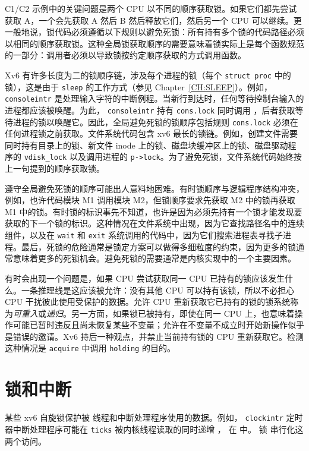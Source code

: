 C1/C2 示例中的关键问题是两个 CPU 以不同的顺序获取锁。如果它们都先尝试获取 A，一个会先获取 A 然后 B 然后释放它们，然后另一个 CPU 可以继续。更一般地说，锁代码必须遵循以下规则以避免死锁：所有持有多个锁的代码路径必须以相同的顺序获取锁。这种全局锁获取顺序的需要意味着锁实际上是每个函数规范的一部分：调用者必须以导致锁按约定顺序获取的方式调用函数。

Xv6 有许多长度为二的锁顺序链，涉及每个进程的锁（每个
\lstinline{struct proc}
中的锁），这是由于
\lstinline{sleep}
的工作方式（参见 Chapter~\ref{CH:SLEEP}）。例如，
\lstinline{consoleintr}
是处理输入字符的中断例程。当新行到达时，任何等待控制台输入的进程都应该被唤醒。为此，
\lstinline{consoleintr}
持有
\lstinline{cons.lock}
同时调用
，后者获取等待进程的锁以唤醒它。因此，全局避免死锁的锁顺序包括规则
\lstinline{cons.lock}
必须在任何进程锁之前获取。文件系统代码包含 xv6 最长的锁链。例如，创建文件需要同时持有目录上的锁、新文件 inode 上的锁、磁盘块缓冲区上的锁、磁盘驱动程序的 \lstinline{vdisk_lock} 以及调用进程的 \lstinline{p->lock}。为了避免死锁，文件系统代码始终按上一句提到的顺序获取锁。

遵守全局避免死锁的顺序可能出人意料地困难。有时锁顺序与逻辑程序结构冲突，例如，也许代码模块 M1 调用模块 M2，但锁顺序要求先获取 M2 中的锁再获取 M1 中的锁。有时锁的标识事先不知道，也许是因为必须先持有一个锁才能发现要获取的下一个锁的标识。这种情况在文件系统中出现，因为它查找路径名中的连续组件，以及在 {\tt wait} 和 {\tt exit} 系统调用的代码中，因为它们搜索进程表寻找子进程。最后，死锁的危险通常是锁定方案可以做得多细粒度的约束，因为更多的锁通常意味着更多的死锁机会。避免死锁的需要通常是内核实现中的一个主要因素。

有时会出现一个问题是，如果 CPU 尝试获取同一 CPU 已持有的锁应该发生什么。一条推理线是这应该被允许：没有其他 CPU 可以持有该锁，所以不必担心 CPU 干扰彼此使用受保护的数据。允许 CPU 重新获取它已持有的锁的锁系统称为{\it 可重入}或{\it 递归}。另一方面，如果锁已被持有，即使在同一 CPU 上，也意味着操作可能已暂时违反且尚未恢复某些不变量；允许在不变量不成立时开始新操作似乎是错误的邀请。Xv6 持后一种观点，并禁止当前持有锁的 CPU 重新获取它。检测这种情况是 {\tt acquire} 中调用 {\tt holding} 的目的。

\section{锁和中断}
\label{s:lockinter}

某些 xv6 自旋锁保护被
线程和中断处理程序使用的数据。例如，
\lstinline{clockintr}
定时器中断处理程序可能在
\lstinline{ticks}
被内核线程读取的同时递增
，
在
中。
锁
串行化这两个访问。

